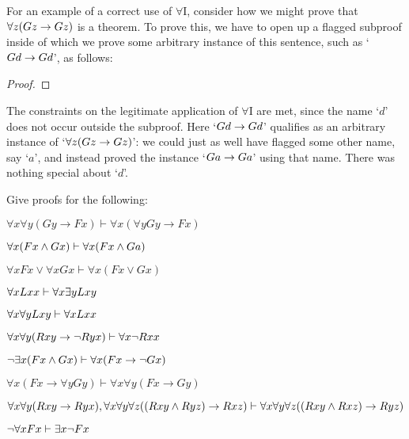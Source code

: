 For an example of a correct use of $\forall$I, consider how we might prove that $\forall z(Gz \rightarrow Gz)$ is a theorem.  To prove this, we have to open up a flagged subproof inside of which we prove some arbitrary instance of this sentence, such as `$Gd \rightarrow Gd$', as follows:

\begin{proof}
	\open
	 \fl{}
	\open
		 
	\close
	\close
\end{proof}
The constraints on the legitimate application of $\forall$I are met, since the name `$d$' does not occur outside the subproof.  Here `$Gd \rightarrow Gd$' qualifies as an arbitrary instance of `$\forall z(Gz \rightarrow Gz)$': we could just as well have flagged some other name, say `$a$', and instead proved the instance `$Ga \rightarrow Ga$' using that name. There was nothing special about `$d$'.


\practiceproblems
\problempart Give proofs for the following:


\begin{earg}

\item $\forall x\forall y(Gy\rightarrow Fx) \vdash \forall x(\forall yGy\rightarrow Fx)$

\item $\forall x (Fx \wedge Gx) \vdash \forall x(Fx \wedge Ga)$

\item $\forall xFx\lor \forall xGx \vdash \forall x(Fx\lor Gx)$

\item $\forall xLxx \vdash \forall x \exists y Lxy$

\item $\forall x \forall y Lxy \vdash \forall xLxx$

\item $\forall x\forall y(Rxy \rightarrow \neg Ryx) \vdash \forall x \neg Rxx$


\item $\neg \exists x(Fx \wedge Gx) \vdash \forall x(Fx \rightarrow \neg Gx)$

\item $\forall x(Fx\rightarrow \forall yGy) \vdash \forall x\forall y(Fx\rightarrow Gy)$

\item $\forall x \forall y(Rxy \rightarrow Ryx), \forall x \forall y \forall z((Rxy \wedge Ryz) \rightarrow Rxz) \vdash \forall x \forall y\forall z((Rxy \wedge Rxz) \rightarrow Ryz)$

\item  $\neg \forall xFx \vdash \exists x\neg Fx$


\end{earg}





